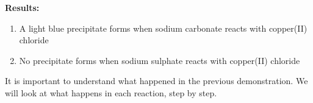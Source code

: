         \par 
      \label{m38719*id340060}\noindent{}\textbf{Results:}
        \newline
      \label{m38719*id340067}\begin{enumerate}[noitemsep, label=\textbf{\arabic*}. ] 
            \label{m38719*uid65}\item A light blue precipitate forms when sodium carbonate reacts with copper(II) chloride
\label{m38719*uid66}\item No precipitate forms when sodium sulphate reacts with copper(II) chloride
\end{enumerate}
        \par 
      \label{m38719*id340106}It is important to understand what happened in the previous demonstration. We will look at what happens in each reaction, step by step.\par 
